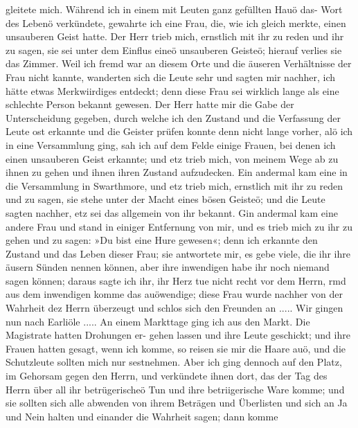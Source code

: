 {%
gleitete mich. Während ich in einem mit Leuten ganz gefüllten
Hauö das- Wort des Lebenö verkündete, gewahrte ich eine Frau,
die, wie ich gleich merkte, einen unsauberen Geist hatte. Der
Herr trieb mich, ernstlich mit ihr zu reden und ihr zu sagen, sie
sei unter dem Einflus eineö unsauberen Geisteö; hierauf verlies
sie das Zimmer. Weil ich fremd war an diesem Orte und die
äuseren Verhältnisse der Frau nicht kannte, wanderten sich die
Leute sehr und sagten mir nachher, ich hätte etwas Merkwiirdiges
entdeckt; denn diese Frau sei wirklich lange als eine schlechte
Person bekannt gewesen. Der Herr hatte mir die Gabe der
Unterscheidung gegeben, durch welche ich den Zustand und die
Verfassung der Leute ost erkannte und die Geister prüfen konnte
denn nicht lange vorher, alö ich in eine Versammlung ging, sah
ich auf dem Felde einige Frauen, bei denen ich einen unsauberen
Geist erkannte; und etz trieb mich, von meinem Wege ab zu ihnen
zu gehen und ihnen ihren Zustand aufzudecken. Ein andermal
kam eine in die Versammlung in Swarthmore, und etz trieb mich,
ernstlich mit ihr zu reden und zu sagen, sie stehe unter der Macht
eines bösen Geisteö; und die Leute sagten nachher, etz sei das
allgemein von ihr bekannt. Gin andermal kam eine andere Frau
und stand in einiger Entfernung von mir, und es trieb mich zu
ihr zu gehen und zu sagen: »Du bist eine Hure gewesen«; denn
ich erkannte den Zustand und das Leben dieser Frau; sie antwortete
mir, es gebe viele, die ihr ihre äusern Sünden nennen können,
aber ihre inwendigen habe ihr noch niemand sagen können; daraus
sagte ich ihr, ihr Herz tue nicht recht vor dem Herrn, rmd
aus dem inwendigen komme das auöwendige; diese Frau wurde
nachher von der Wahrheit dez Herrn überzeugt und schlos sich
den Freunden an .....
Wir gingen nun nach Earliöle ..... An einem Markttage
ging ich aus den Markt. Die Magistrate hatten Drohungen er-
gehen lassen und ihre Leute geschickt; und ihre Frauen hatten
gesagt, wenn ich komme, so reisen sie mir die Haare auö, und
die Schutzleute sollten mich nur sestnehmen. Aber ich ging dennoch
auf den Platz, im Gehorsam gegen den Herrn, und verkündete
ihnen dort, das der Tag des Herrn über all ihr betrügerischeö
Tun und ihre betriigerische Ware komme; und sie sollten sich alle
abwenden von ihrem Beträgen und Überlisten und sich an Ja
und Nein halten und einander die Wahrheit sagen; dann komme


}
